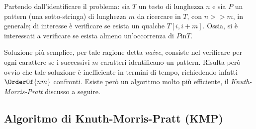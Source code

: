 \documentclass{subfiles}
\begin{document}
Partendo dall'identificare il problema: sia \(T\) un testo di lunghezza \(n\) e sia \(P\) un pattern (una sotto-stringa) di lunghezza \(m\) da ricercare in \(T\),
con \(n >> m\), in generale; di interesse è verificare se esista un qualche \(T[i, i + m]\).
Ossia, si è interessati a verificare se esista almeno un'occorrenza di \(P \text{in} T\).

Soluzione più semplice, per tale ragione detta \emph{naive}, consiste nel verificare per ogni carattere se i successivi \(m\) caratteri identificano un pattern.
Risulta però ovvio che tale soluzione è inefficiente in termini di tempo, richiedendo infatti \(\OrderOf{nm}\) confronti.
Esiste però un algoritmo molto più efficiente, il \emph{Knuth-Morris-Pratt} discusso a seguire.

\subsection{Algoritmo di Knuth-Morris-Pratt (KMP)}

\clearpage
\end{document}
